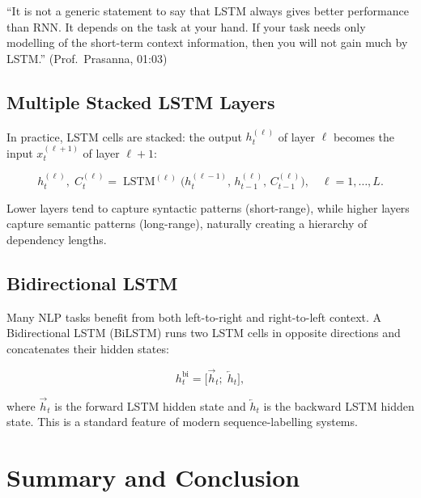 \documentclass[12pt,a4paper]{article}
\begin{document}
\begin{warningbox}[title=LSTM is Not Always Better]
  ``It is not a generic statement to say that LSTM always gives better
  performance than RNN. It depends on the task at your hand. If your task
  needs only modelling of the short-term context information, then you will
  not gain much by LSTM.'' \hfill (Prof.\ Prasanna, 01:03)
\end{warningbox}

\subsection{Multiple Stacked LSTM Layers}
\label{subsec:stacked}

In practice, LSTM cells are stacked: the output $h_t^{(\ell)}$ of layer
$\ell$ becomes the input $x_t^{(\ell+1)}$ of layer $\ell+1$:

\begin{equation}
  \label{eq:stacked}
  h_t^{(\ell)},\; C_t^{(\ell)}
  = \operatorname{LSTM}^{(\ell)}\!\bigl(h_t^{(\ell-1)},\,
    h_{t-1}^{(\ell)},\, C_{t-1}^{(\ell)}\bigr),
  \quad \ell = 1,\ldots,L.
\end{equation}

Lower layers tend to capture syntactic patterns (short-range), while
higher layers capture semantic patterns (long-range), naturally creating a
hierarchy of dependency lengths.

\subsection{Bidirectional LSTM}
\label{subsec:bilstm}

Many NLP tasks benefit from both left-to-right and right-to-left context.
A Bidirectional LSTM (BiLSTM) runs two LSTM cells in opposite directions
and concatenates their hidden states:

\begin{equation}
  \label{eq:bilstm}
  h_t^{\text{bi}} = \bigl[\overrightarrow{h}_t;\; \overleftarrow{h}_t\bigr],
\end{equation}

where $\overrightarrow{h}_t$ is the forward LSTM hidden state and
$\overleftarrow{h}_t$ is the backward LSTM hidden state. This is
a standard feature of modern sequence-labelling systems.

\section{Summary and Conclusion}
\label{sec:conclusion}
\end{document}
